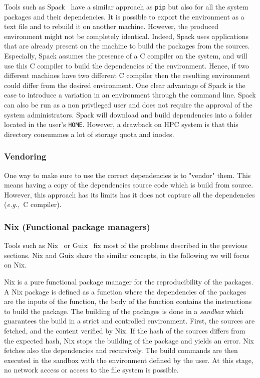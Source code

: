 \documentclass[sigconf]{acmart}
\newcommand{\eg}{\emph{e.g.,}}
\begin{document}
Tools such as Spack\ \cite{gamblin_spack_2015} have a similar approach as \texttt{pip} but also for all the system packages and their dependencies.
It is possible to export the environment as a text file and to rebuild it on another machine.
However, the produced environment might not be completely identical.
Indeed, Spack uses applications that are already present on the machine to build the packages from the sources.
Especially, Spack assumes the presence of a C compiler on the system, and will use this C compiler to build the dependencies of the environment.
Hence, if two different machines have two different C compiler then the resulting environment could differ from the desired environment.
One clear advantage of Spack is the ease to introduce a variation in an environment through the command line.
Spack can also be run as a non privileged user and does not require the approval of the system administrators.
Spack will download and build dependencies into a folder located in the user's \texttt{HOME}.
However, a drawback on HPC system is that this directory consummes a lot of storage quota and inodes.

\subsubsection{Vendoring}

One way to make sure to use the correct dependencies is to "vendor" them.
This means having a copy of the dependencies source code which is build from source.
However, this approach has its limits has it does not capture all the dependencies (\eg\ C compiler).

\subsubsection{Nix (Functional package managers)}

Tools such as Nix\ \cite{dolstra_nix_2004} or Guix\ \cite{courtes_functional_2013} fix most of the problems described in the previous sections.
Nix and Guix share the similar concepts, in the following we will focus on Nix.

Nix is a pure functional package manager for the reproducibility of the packages.
A Nix package is defined as a function where the dependencies of the packages are the inputs of the function, the body of the function contains the instructions to build the package.
The building of the packages is done in a \emph{sandbox} which guarantees the build in a strict and controlled environment.
First, the sources are fetched, and the content verified by Nix.
If the hash of the sources differs from the expected hash, Nix stops the building of the package and yields an error.
Nix fetches also the dependencies and recursively.
The build commands are then executed in the sandbox with the environment defined by the user.
At this stage, no network access or access to the file system is possible.
\end{document}
